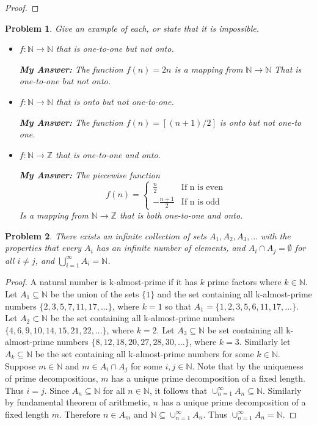 \documentclass[12pt]{article}
\newtheorem{problem}{Problem}
\newcommand{\NN}{\ensuremath{\mathbb N}}
\newcommand{\ZZ}{\ensuremath{\mathbb Z}}
\begin{document}
\begin{proof}
%
\end{proof}


\begin{problem} %
Give an example of each, or state that it is impossible.
\begin{itemize}
\item[(a)] $f:\NN\to\NN$ that is one-to-one but not onto.

	\textbf{My Answer: } The function $f(n) = 2n$ is a mapping from $\NN \rightarrow \NN$ That is one-to-one but not onto.
\item[(b)] $f:\NN\to\NN$ that is onto but not one-to-one.

	\textbf{My Answer: } The function $f(n) = [(n+1)/2]$ is onto but not one-to one.
\item[(d)] $f:\NN\to\ZZ$ that is one-to-one and onto.

	\textbf{My Answer: } The piecewise function $$f(n) =\begin{cases} \frac{n}{2} & \text{If n is even} \\
	-\frac{n+1}{2} & \text{If n is odd}\end{cases} $$
		Is a mapping from $\NN \rightarrow \ZZ$ that is both one-to-one and onto.
	

\end{itemize}
\end{problem}



\begin{problem} %
There exists an infinite collection of sets $A_1,A_2,A_3,\dots$ with the properties that every $A_i$ has an infinite number of elements, and $A_i\cap A_j=\emptyset$ for all $i\ne j$, and $\bigcup_{i=1}^\infty A_i=\NN$. \end{problem}

\begin{proof}
	A natural number is k-almost-prime if it has $k$ prime factors where $k \in \NN$.
	Let $A_1 \subseteq \NN$ be the union of the sets $\{1\}$ and the set containing all k-almost-prime numbers $\{2,3,5,7,11,17, ...\}$, where $k = 1$ so that $A_1 = \{1,2,3,5,6,11,17,...\}$. Let $A_2 \subset \NN$ be the set containing all k-almost-prime numbers $\{4,6,9,10,14,15,21,22,...\}$, where $k = 2$. Let $A_3 \subseteq \NN$ be set containing all k-almost-prime numbers $\{8, 12, 18, 20, 27, 28, 30, … \}$, where $k = 3$. Similarly let $A_k \subseteq \NN$ be the set containing all k-almost-prime numbers for some $k \in \NN$. Suppose $m \in \NN$ and $m \in A_i \cap A_j$ for some $i, j \in \NN$. Note that by the uniqueness of prime decompositions, $m$ has a unique prime decomposition of a fixed length. Thus $i = j$. Since $A_n \subseteq \NN$ for all $n \in \NN$, it follows that $\cup_{n=1}^{\infty}A_n \subseteq \NN$. Similarly by fundamental theorem of arithmetic, $n$ has a unique prime decomposition of a fixed length $m$. Therefore $n \in A_m$ and $\NN \subseteq \cup_{n=1}^{\infty} A_n$. Thus $\cup_{n=1}^{\infty} A_n = \NN$.
\end{proof}
\end{document}
